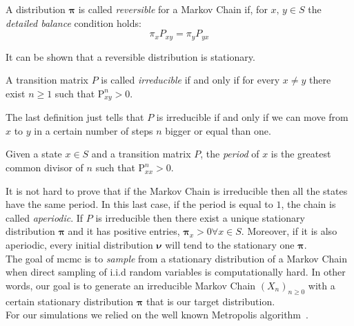 \documentclass[\rootdir/main.tex]{subfiles}
\begin{document}
\begin{definition}\label{def:detailed_balance}
    A distribution $\symbf{\pi}$ is called \emph{reversible} for a Markov Chain if, for $x,\,y \in S$ the \emph{detailed balance} condition holds:
    \begin{equation*}
        \pi_x P_{xy} = \pi_y P_{yx}
    \end{equation*}
\end{definition}
It can be shown that a reversible distribution is stationary.
\begin{definition}
    A transition matrix $P$ is called \emph{irreducible} if and only if for every $x \neq y$ there exist $n \geq 1$ such that $ \mathrm{P}_{xy}^n > 0$.
\end{definition}
The last definition just tells that $P$ is irreducible if and only if we can move from $x$ to $y$ in a certain number of steps $n$ bigger or equal than one.
\begin{definition}
    Given a state $x \in S$ and a transition matrix $P$, the \emph{period} of $x$ is the greatest common divisor of $n$ such that $\mathrm{P}_{xx}^n > 0$.
\end{definition}
It is not hard to prove that if the Markov Chain is irreducible then all the states have the same period. In this last case, if the period is equal to $1$, the chain is called \emph{aperiodic}.
If $P$ is irreducible then there exist a unique stationary distribution $\symbf{\pi}$ and it has positive entries, \ie $\symbf{\pi}_x > 0 \forall x \in S$. Moreover, if it is also aperiodic, every initial distribution $\symbf{\nu}$ will tend to the stationary one $\symbf{\pi}$.\\
The goal of \acrlong{mcmc} is to \emph{sample} from a stationary distribution of a Markov Chain when direct sampling of i.i.d random variables is computationally hard.
In other words, our goal is to generate an irreducible Markov Chain $\left(X_n \right)_{n \geq 0}$ with a certain stationary distribution $\symbf{\pi}$ that is our target distribution.\\
For our simulations we relied on the well known Metropolis algorithm~\cite{metropolis}. 
\end{document}
